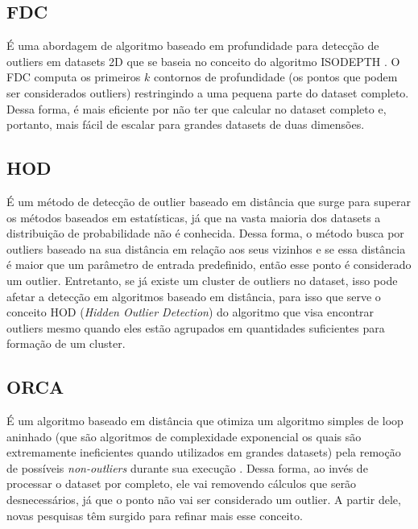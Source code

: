 \subsection{FDC}

É uma abordagem de algoritmo baseado em profundidade \cite{Johnson:1998:FCD:3000292.3000332} para detecção de outliers em datasets 2D que se baseia no conceito do algoritmo ISODEPTH \cite{RUTS1996}. O FDC computa os primeiros $k$ contornos de profundidade (os pontos que podem ser considerados outliers) restringindo a uma pequena parte do dataset completo. Dessa forma, é mais eficiente por não ter que calcular no dataset completo e, portanto, mais fácil de escalar para grandes datasets de duas dimensões.

\subsection{HOD}

É um método de detecção de outlier baseado em distância \cite{Xu2016} que surge para superar os métodos baseados em estatísticas, já que na vasta maioria dos datasets a distribuição de probabilidade não é conhecida. Dessa forma, o método busca por outliers baseado na sua distância em relação aos seus vizinhos e se essa distância é maior que um parâmetro de entrada predefinido, então esse ponto é considerado um outlier. Entretanto, se já existe um cluster de outliers no dataset, isso pode afetar a detecção em algoritmos baseado em distância, para isso que serve o conceito HOD (\textit{Hidden Outlier Detection}) do algoritmo que visa encontrar outliers mesmo quando eles estão agrupados em quantidades suficientes para formação de um cluster.

\subsection{ORCA}

É um algoritmo baseado em distância \cite{Bay:2003:MDO:956750.956758} que otimiza um algoritmo simples de loop aninhado (que são algoritmos de complexidade exponencial os quais são extremamente ineficientes quando utilizados em grandes datasets) pela remoção de possíveis \textit{non-outliers} durante sua execução \cite{Knorr:1999:FIK:645925.671529,Knorr:2000:DOA:764212.764218,Ramaswamy:2000:EAM:335191.335437}. Dessa forma, ao invés de processar o dataset por completo, ele vai removendo cálculos que serão desnecessários, já que o ponto não vai ser considerado um outlier. A partir dele, novas pesquisas têm surgido para refinar mais esse conceito. 

